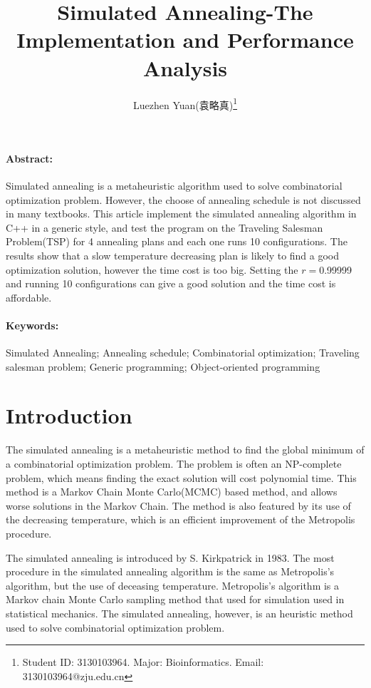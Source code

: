 \documentclass[10.5pt,a4paper]{article}
\date{}
\title{Simulated Annealing-The Implementation and Performance Analysis}
\author{Luezhen Yuan(袁略真)\footnote{Student ID: 3130103964. Major: Bioinformatics. Email: 3130103964@zju.edu.cn}}
\begin{document}
\maketitle
\section*{}
\paragraph{Abstract:}Simulated annealing is a metaheuristic algorithm used to solve combinatorial optimization problem. However, the choose of annealing schedule is not discussed in many textbooks. This article implement the simulated annealing algorithm in C++ in a generic style, and test the program on the Traveling Salesman Problem(TSP) for 4 annealing plans and each one runs 10 configurations. The results show that a slow temperature decreasing plan is likely to find a good optimization solution, however the time cost is too big. Setting the $r=$0.99999 and running 10 configurations can give a good solution and the time cost is affordable.

\paragraph{Keywords:}Simulated Annealing; Annealing schedule; Combinatorial optimization; Traveling salesman problem; Generic programming; Object-oriented programming

\section{Introduction}
The simulated annealing is a metaheuristic method to find the global minimum of a combinatorial optimization problem\cite{3}. The problem is often an NP-complete problem, which means finding the exact solution will cost polynomial time. This method is a Markov Chain Monte Carlo(MCMC) based method, and allows worse solutions in the Markov Chain. The method is also featured by its use of the decreasing temperature, which is an efficient improvement of the Metropolis procedure.


The simulated annealing is introduced by S. Kirkpatrick\cite{1} in 1983. The most procedure in the simulated annealing algorithm is the same as Metropolis's algorithm, but the use of deceasing temperature. Metropolis's algorithm is a Markov chain Monte Carlo sampling method that used for simulation used in statistical mechanics. The simulated annealing, however, is an heuristic method used to solve combinatorial optimization problem.
\end{document}
